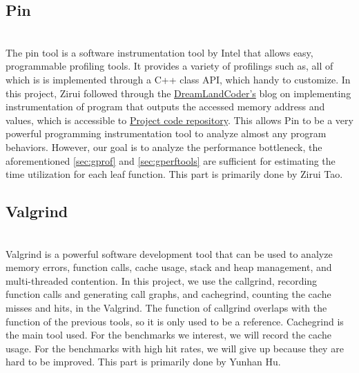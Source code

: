\documentclass[9pt]{article}
\begin{document}
\subsection{Pin}\\
The pin tool \cite{luk2005pin} is a software instrumentation tool by Intel that allows easy, programmable profiling tools. It provides a variety of profilings such as, all of which is is implemented through a C++ class API, which handy to customize. In this project, Zirui followed through the \href{https://www.dreamlandcoder.com/system-security/how-i-learned/intel_pin/}{DreamLandCoder's} blog on implementing instrumentation of program that outputs the accessed memory address and values, which is accessible to \href{https://github.com/tzrtzr000/AccPlusPlus/blob/master/pin/memTrace.cpp}{Project code repository}. This allows Pin to be a very powerful programming instrumentation tool to analyze almost any program behaviors. However, our goal is to analyze the performance bottleneck, the aforementioned \ref{sec:gprof} and \ref{sec:gperftools} are sufficient for estimating the time utilization for each leaf function.
This part is primarily done by Zirui Tao. 

\subsection{Valgrind}\\
Valgrind is a powerful software development tool that can be used to analyze memory errors, function calls, cache usage, stack and heap management, and multi-threaded contention. In this project, we use the callgrind, recording function calls and generating call graphs, and cachegrind, counting the cache misses and hits, in the Valgrind. The function of callgrind overlaps with the function of the previous tools, so it is only used to be a reference. Cachegrind is the main tool used. For the benchmarks we interest, we will record the cache usage. For the benchmarks with high hit rates, we will give up because they are hard to be improved. This part is primarily done by Yunhan Hu. 

\end{document}
